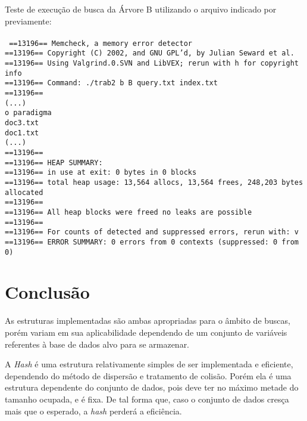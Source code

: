 \documentclass[
	11pt,				%
	oneside,			%
	a4paper,			%
	english,			%
	brazil,				%
	]{article}
\begin{document}
Teste de execução de busca da Árvore B utilizando o arquivo indicado por previamente:
\\\\
\texttt{
==13196== Memcheck, a memory error detector \\
==13196== Copyright (C) 2002, and GNU GPL'd, by Julian Seward et al. \\
==13196== Using Valgrind.0.SVN and LibVEX; rerun with \-h for copyright info \\
==13196== Command: ./trab2 \-b B query.txt index.txt \\
==13196==  \\
(...) \\
o paradigma \\
doc3.txt \\
doc1.txt \\
(...) \\
==13196==  \\
==13196== HEAP SUMMARY: \\
==13196==     in use at exit: 0 bytes in 0 blocks \\
==13196==   total heap usage: 13,564 allocs, 13,564 frees, 248,203 bytes allocated \\
==13196==  \\
==13196== All heap blocks were freed \-\- no leaks are possible \\
==13196==  \\
==13196== For counts of detected and suppressed errors, rerun with: \-v \\
==13196== ERROR SUMMARY: 0 errors from 0 contexts (suppressed: 0 from 0) \\
}
\section{Conclusão}
As estruturas implementadas são ambas apropriadas para o âmbito de buscas, porém variam em sua aplicabilidade dependendo de um conjunto de variáveis referentes à base de dados alvo para se armazenar.

A \textit{Hash} é uma estrutura relativamente simples de ser implementada e eficiente, dependendo do método de dispersão e tratamento de colisão. Porém ela é uma estrutura dependente do conjunto de dados, pois deve ter no máximo metade do tamanho ocupada, e é fixa. De tal forma que, caso o conjunto de dados cresça mais que o esperado, a \textit{hash} perderá a eficiência.
\end{document}
